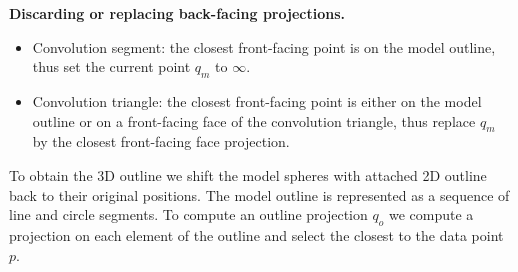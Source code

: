 
\textbf{Discarding or replacing back-facing projections.}
\begin{itemize}
	\item Convolution segment: the closest front-facing point is on the model outline, thus set the current point $q_m$ to $\infty$.
	\item Convolution triangle: the closest front-facing point is either on the model outline or on a front-facing face of the convolution triangle, thus replace $q_m$ by the closest front-facing face projection.
\end{itemize}

To obtain the 3D outline we shift the model spheres with attached 2D outline back to their original positions. The model outline is represented as a sequence of line and circle segments. To compute an outline projection $q_o$ we compute a projection on each element of the outline and select the closest to the data point $p$.